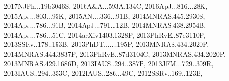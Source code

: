 \documentclass[12pt]{article}
\begin{document}
\begin{enumerate}
\begin{enumerate}
{2017NJPh...19b3046S,%
2016A&A...593A.134C,%
2016ApJ...816...28K,%
2015ApJ...803...95K,%
2015AN....336...91B,%
2014MNRAS.445.2930S,%
2014ApJ...786...91B,%
2014ApJ...791...12B,%
2014MNRAS.438.2954B,%
2014ApJ...786...51C,%
2014arXiv1403.1328P,%
2013PhRvE..87e3110P,%
2013SSRv..178..163B,%
2013PhDT.......195P,%
2013MNRAS.434.2020P,%
2014MNRAS.444.3837P,%
2013PhRvE..87d3104C,%
2013MNRAS.434.2020P,%
2013MNRAS.429.1686D,%
2013IAUS..294..387B,%
2013JFM...729..309R,%
2013IAUS..294..353C,%
2012IAUS..286...49C,%
2012SSRv..169..123B,%
}
\end{enumerate}
\end{enumerate}
\end{document}
